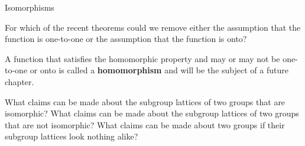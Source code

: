 \begin{section}{Isomorphisms}
\begin{problem}
For which of the recent theorems could we remove either the assumption that the function is one-to-one or the assumption that the function is onto?
\end{problem}

A function that satisfies the homomorphic property and may or may not be one-to-one or onto is called a \textbf{homomorphism} and will be the subject of a future chapter.

\begin{problem}
What claims can be made about the subgroup lattices of two groups that are isomorphic? What claims can be made about the subgroup lattices of two groups that are not isomorphic?  What claims can be made about two groups if their subgroup lattices look nothing alike?
\end{problem}

\end{section}
